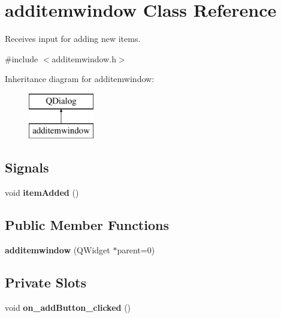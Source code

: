 \hypertarget{classadditemwindow}{}\section{additemwindow Class Reference}
\label{classadditemwindow}


Receives input for adding new items.  




{\ttfamily \#include $<$additemwindow.\+h$>$}

Inheritance diagram for additemwindow\+:\begin{figure}[H]
\begin{center}
\leavevmode
\includegraphics[height=2.000000cm]{classadditemwindow}
\end{center}
\end{figure}
\subsection*{Signals}
\begin{DoxyCompactItemize}
\item 
\mbox{\label{classadditemwindow_a39cd74ac2d384833187ec87fc703d901}} 
void {\bfseries item\+Added} ()
\end{DoxyCompactItemize}
\subsection*{Public Member Functions}
\begin{DoxyCompactItemize}
\item 
\mbox{\label{classadditemwindow_a16c07f6c0860493347c14c9049dda2e4}} 
{\bfseries additemwindow} (Q\+Widget $\ast$parent=0)
\end{DoxyCompactItemize}
\subsection*{Private Slots}
\begin{DoxyCompactItemize}
\item 
\mbox{\label{classadditemwindow_af826760a7eaf21c2c8d709ded991754d}} 
void {\bfseries on\+\_\+add\+Button\+\_\+clicked} ()
\end{DoxyCompactItemize}
